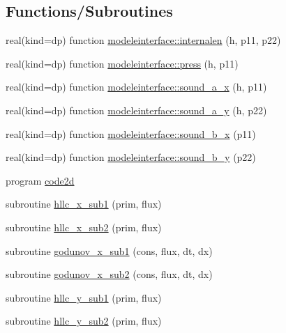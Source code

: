 \subsection*{Functions/\+Subroutines}
\begin{DoxyCompactItemize}
\item 
real(kind=dp) function \mbox{\hyperlink{namespacemodeleinterface_a4d0b51322903b5a095f04aaafb1a8c5f}{modeleinterface\+::internalen}} (h, p11, p22)
\item 
real(kind=dp) function \mbox{\hyperlink{namespacemodeleinterface_ad34088de8c0162343994153e8f34921e}{modeleinterface\+::press}} (h, p11)
\item 
real(kind=dp) function \mbox{\hyperlink{namespacemodeleinterface_a1505c575aa44b45a8509fe827f28bc8d}{modeleinterface\+::sound\+\_\+a\+\_\+x}} (h, p11)
\item 
real(kind=dp) function \mbox{\hyperlink{namespacemodeleinterface_aea42339ec55b6d0e7333dcd4c2d6041f}{modeleinterface\+::sound\+\_\+a\+\_\+y}} (h, p22)
\item 
real(kind=dp) function \mbox{\hyperlink{namespacemodeleinterface_aa422a9d23665a7fa175a3458f15d6be2}{modeleinterface\+::sound\+\_\+b\+\_\+x}} (p11)
\item 
real(kind=dp) function \mbox{\hyperlink{namespacemodeleinterface_ae6539d207be975bdb5b8c45826062a30}{modeleinterface\+::sound\+\_\+b\+\_\+y}} (p22)
\item 
program \mbox{\hyperlink{main2Dv1_01_07copy_08_8f90_a8712173bc20143ca5b1b8cbd782b563e}{code2d}}
\item 
subroutine \mbox{\hyperlink{main2Dv1_01_07copy_08_8f90_ad651365c868e762b033239f23065b179}{hllc\+\_\+x\+\_\+sub1}} (prim, flux)
\item 
subroutine \mbox{\hyperlink{main2Dv1_01_07copy_08_8f90_a542b368221e3c5b6eed538ddc6538ca5}{hllc\+\_\+x\+\_\+sub2}} (prim, flux)
\item 
subroutine \mbox{\hyperlink{main2Dv1_01_07copy_08_8f90_aec66a1d113ade1d60ad864482ea8e4cf}{godunov\+\_\+x\+\_\+sub1}} (cons, flux, dt, dx)
\item 
subroutine \mbox{\hyperlink{main2Dv1_01_07copy_08_8f90_a95998c355563e1e58114aea99de5433b}{godunov\+\_\+x\+\_\+sub2}} (cons, flux, dt, dx)
\item 
subroutine \mbox{\hyperlink{main2Dv1_01_07copy_08_8f90_a3abf545225182ebde80c72121d2de6f2}{hllc\+\_\+y\+\_\+sub1}} (prim, flux)
\item 
subroutine \mbox{\hyperlink{main2Dv1_01_07copy_08_8f90_a66b4ae2bdd9b70fca9079c3827fa8c30}{hllc\+\_\+y\+\_\+sub2}} (prim, flux)

\end{DoxyCompactItemize}
